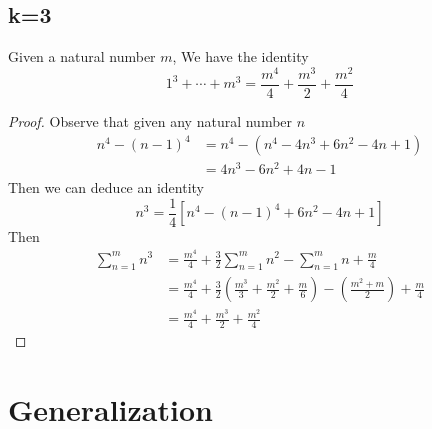 \documentclass{report}
\begin{document}
\section{k=3}%
\begin{theorem}
  Given a natural number $m$, We have the identity 
\begin{equation}
1^3+\cdots +m^3=\frac{m^4}{4}+ \frac{m^3}{2}+\frac{m^2}{4}
\end{equation} 
\end{theorem} 
\begin{proof}
Observe that given any natural number $n$
\begin{align}
  n^{4}-( n-1 ) ^{4}&= n^{4}- ( n^{4}-4n^3+6n^2-4n+1 )\\&=4n^3-6n^2+4n-1 
\end{align} 
Then we can deduce an identity
\begin{equation}
 n^3=\frac{1}{4} [ n^4-( n-1 ) ^4+6n^2-4n+1 ]
\end{equation} 
Then
\begin{align}
  \sum_{n=1}^{m} n^3&=\frac{m^4}{4}+\frac{3}{2}\sum_{n=1}^{m} n^2-\sum_{n=1}^{m} n+\frac{m}{4} 
  \\&= \frac{m^4}{4}+\frac{3}{2}( \frac{m^3}{3}+\frac{m^2}{2}+\frac{m}{6} ) - (  \frac{m^2+m}{2}	) +\frac{m}{4}
  \\&=\frac{m^4}{4}+ \frac{m^3}{2}+\frac{m^2}{4}
\end{align} 
\end{proof} 
\chapter{Generalization}
\end{document}
